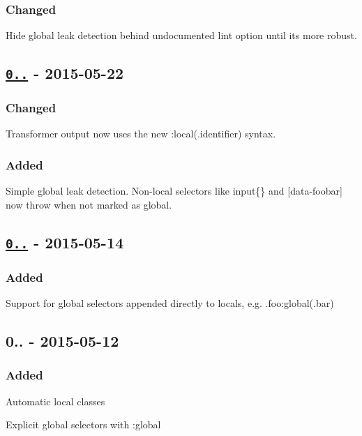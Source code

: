 \subsubsection*{Changed}


\begin{DoxyItemize}
\item Hide global leak detection behind undocumented {\ttfamily lint} option until it\textquotesingle{}s more robust.
\end{DoxyItemize}

\subsection*{\href{https://github.com/postcss-modules-local-by-default/compare/v0.0.2...v0.0.3}{\tt 0..} -\/ 2015-\/05-\/22}

\subsubsection*{Changed}


\begin{DoxyItemize}
\item Transformer output now uses the new {\ttfamily \+:local(.identifier)} syntax.
\end{DoxyItemize}

\subsubsection*{Added}


\begin{DoxyItemize}
\item Simple global leak detection. Non-\/local selectors like {\ttfamily input\{\}} and {\ttfamily \mbox{[}data-\/foobar\mbox{]}} now throw when not marked as global.
\end{DoxyItemize}

\subsection*{\href{https://github.com/postcss-modules-local-by-default/compare/v0.0.1...v0.0.2}{\tt 0..} -\/ 2015-\/05-\/14}

\subsubsection*{Added}


\begin{DoxyItemize}
\item Support for global selectors appended directly to locals, e.\+g. {\ttfamily .foo\+:global(.bar)}
\end{DoxyItemize}

\subsection*{0.. -\/ 2015-\/05-\/12}

\subsubsection*{Added}


\begin{DoxyItemize}
\item Automatic local classes
\item Explicit global selectors with {\ttfamily \+:global} 
\end{DoxyItemize}